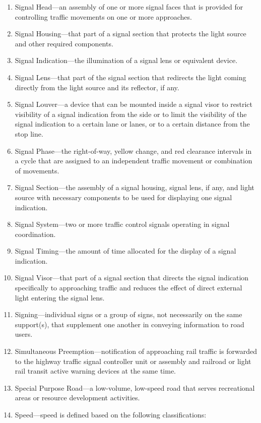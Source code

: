 \documentclass[9pt]{memoir}
\begin{document}
{\begin{enumerate}[label=\arabic*., ref=\arabic*]
\item Signal Head---an assembly of one or more signal faces that is provided for controlling traffic movements on one or more approaches.
\item Signal Housing---that part of a signal section that protects the light source and other required components.
\item Signal Indication---the illumination of a signal lens or equivalent device.
\item Signal Lens---that part of the signal section that redirects the light coming directly from the light source and its reflector, if any.
\item Signal Louver---a device that can be mounted inside a signal visor to restrict visibility of a signal indication from the side or to limit the visibility of the signal indication to a certain lane or lanes, or to a certain distance from the stop line.
\item Signal Phase---the right-of-way, yellow change, and red clearance intervals in a cycle that are assigned to an independent traffic movement or combination of movements.
\item Signal Section---the assembly of a signal housing, signal lens, if any, and light source with necessary components to be used for displaying one signal indication.
\item Signal System---two or more traffic control signals operating in signal coordination.
\item Signal Timing---the amount of time allocated for the display of a signal indication.
\item Signal Visor---that part of a signal section that directs the signal indication specifically to approaching traffic and reduces the effect of direct external light entering the signal lens.
\item Signing---individual signs or a group of signs, not necessarily on the same support(s), that supplement one another in conveying information to road users.
\item Simultaneous Preemption---notification of approaching rail traffic is forwarded to the highway traffic signal controller unit or assembly and railroad or light rail transit active warning devices at the same time.
\item Special Purpose Road---a low-volume, low-speed road that serves recreational areas or resource development activities.
\item Speed---speed is defined based on the following classifications:
\begin{enumerate}[label=\alph*., ref=(\alph*)]

\end{enumerate}
\end{enumerate}}
\end{document}
